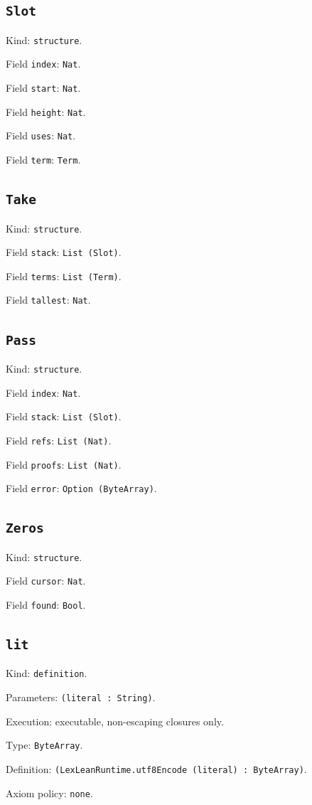 \documentclass[11pt]{article}
\begin{document}
\subsection*{\texttt{Slot}}
\noindent Kind: \texttt{structure}.\par
\noindent Field \texttt{index}: \texttt{Nat}.\par
\noindent Field \texttt{start}: \texttt{Nat}.\par
\noindent Field \texttt{height}: \texttt{Nat}.\par
\noindent Field \texttt{uses}: \texttt{Nat}.\par
\noindent Field \texttt{term}: \texttt{Term}.\par
\subsection*{\texttt{Take}}
\noindent Kind: \texttt{structure}.\par
\noindent Field \texttt{stack}: \texttt{List (Slot)}.\par
\noindent Field \texttt{terms}: \texttt{List (Term)}.\par
\noindent Field \texttt{tallest}: \texttt{Nat}.\par
\subsection*{\texttt{Pass}}
\noindent Kind: \texttt{structure}.\par
\noindent Field \texttt{index}: \texttt{Nat}.\par
\noindent Field \texttt{stack}: \texttt{List (Slot)}.\par
\noindent Field \texttt{refs}: \texttt{List (Nat)}.\par
\noindent Field \texttt{proofs}: \texttt{List (Nat)}.\par
\noindent Field \texttt{error}: \texttt{Option (ByteArray)}.\par
\subsection*{\texttt{Zeros}}
\noindent Kind: \texttt{structure}.\par
\noindent Field \texttt{cursor}: \texttt{Nat}.\par
\noindent Field \texttt{found}: \texttt{Bool}.\par
\subsection*{\texttt{lit}}
\noindent Kind: \texttt{definition}.\par
\noindent Parameters: \texttt{(literal : String)}.\par
\noindent Execution: executable, non-escaping closures only.\par
\noindent Type: \texttt{ByteArray}.\par
\noindent Definition: \texttt{(LexLeanRuntime.utf8Encode (literal) : ByteArray)}.\par
\noindent Axiom policy: \texttt{none}.\par
\end{document}
